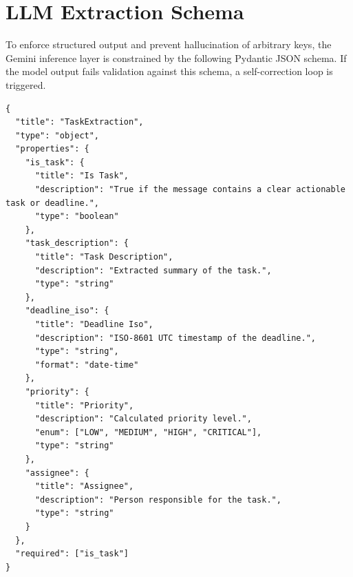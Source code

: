 \section{LLM Extraction Schema}
\label{appendix:schema}

To enforce structured output and prevent hallucination of arbitrary keys, the Gemini inference layer is constrained by the following Pydantic JSON schema. If the model output fails validation against this schema, a self-correction loop is triggered.

\lstset{
  basicstyle=\footnotesize\ttfamily,
  breaklines=true,
  columns=fullflexible
}
\begin{lstlisting}
{
  "title": "TaskExtraction",
  "type": "object",
  "properties": {
    "is_task": {
      "title": "Is Task",
      "description": "True if the message contains a clear actionable task or deadline.",
      "type": "boolean"
    },
    "task_description": {
      "title": "Task Description",
      "description": "Extracted summary of the task.",
      "type": "string"
    },
    "deadline_iso": {
      "title": "Deadline Iso",
      "description": "ISO-8601 UTC timestamp of the deadline.",
      "type": "string",
      "format": "date-time"
    },
    "priority": {
      "title": "Priority",
      "description": "Calculated priority level.",
      "enum": ["LOW", "MEDIUM", "HIGH", "CRITICAL"],
      "type": "string"
    },
    "assignee": {
      "title": "Assignee",
      "description": "Person responsible for the task.",
      "type": "string"
    }
  },
  "required": ["is_task"]
}
\end{lstlisting}

